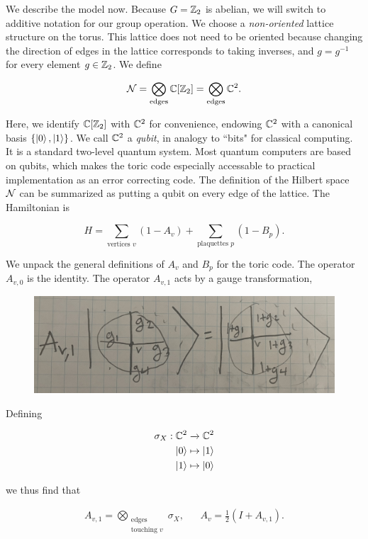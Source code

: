\documentclass{article}
\theoremstyle{definition}
\numberwithin{figure}{section}
\begin{document}
We describe the model now. Because $G=\mathbb{Z}_2$ is abelian, we will switch to additive notation for our group operation. We choose a \textit{non-oriented} lattice structure on the torus. This lattice does not need to be oriented because changing the direction of edges in the lattice corresponds to taking inverses, and $g=g^{-1}$ for every element $g\in \mathbb{Z}_2$. We define

$$\mathcal{N} = \bigotimes_{\text{edges}}\mathbb{C}[\mathbb{Z}_2]=\bigotimes_{\text{edges}}\mathbb{C}^2.$$

Here, we identify $\mathbb{C}[\mathbb{Z}_2]$ with $\mathbb{C}^2$ for convenience, endowing $\mathbb{C}^2$ with a canonical basis $\{\ket{0},\ket{1}\}$. We call $\mathbb{C}^2$ a \textit{qubit}, in analogy to ``bits" for classical computing. It is a standard two-level quantum system. Most quantum computers are based on qubits, which makes the toric code especially accessable to practical implementation as an error correcting code. The definition of the Hilbert space $\mathcal{N}$ can be summarized as putting a qubit on every edge of the lattice. The Hamiltonian is

$$H=\sum_{\text{vertices }v}(1-A_v)+\sum_{\text{plaquettes }p}(1-B_p).$$

We unpack the general definitions of $A_v$ and $B_p$ for the toric code. The operator $A_{v,0}$ is the identity. The operator $A_{v,1}$ acts by a gauge transformation,

\begin{figure}[h]
\begin{center}
\includegraphics[scale=.04]{Av-gauge-action}
\end{center}
\end{figure}

Defining

\begin{align*}
\sigma_X:\mathbb{C}^2&\xrightarrow{}\mathbb{C}^2\\
\ket{0}&\mapsto \ket{1}\\
\ket{1}&\mapsto \ket{0}
\end{align*}

we thus find that

\begin{align*}
A_{v,1}=\bigotimes_{\substack{\text{edges} \\ \text{touching }v}}\sigma_X, && A_v=\frac{1}{2}\left(I + A_{v,1}\right).
\end{align*}
\end{document}
